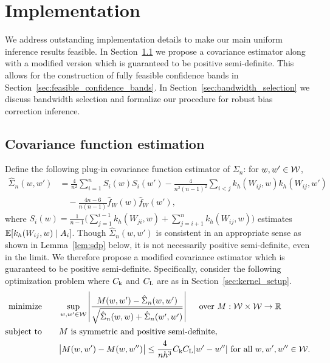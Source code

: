 \section{Implementation}\label{sec:implementation}

We address outstanding implementation details to make our main
uniform inference results feasible.
In Section~\ref{sec:covariance_estimation} we propose a covariance estimator
along with a modified version which is guaranteed to be positive semi-definite.
This allows for the construction of fully feasible confidence bands
in Section~\ref{sec:feasible_confidence_bands}.
In Section~\ref{sec:bandwidth_selection} we discuss bandwidth selection
and formalize our procedure for
robust bias correction inference.

\subsection{Covariance function estimation}
\label{sec:covariance_estimation}

Define the following plug-in covariance function
estimator of $\Sigma_n$: for $w, w' \in \mathcal{W}$,
%
\begin{align*}
  \hat \Sigma_n(w,w')
  &=
  \frac{4}{n^2}
  \sum_{i=1}^n
  S_i(w) S_i(w')
  -
  \frac{4}{n^2(n-1)^2}
  \sum_{i<j}
  k_h(W_{i j},w)
  k_h(W_{i j},w') \\
  &\quad-
  \frac{4n-6}{n(n-1)}
  \hat f_W(w)
  \hat f_W(w'),
\end{align*}
%
where
$S_i(w) = \frac{1}{n-1} \big( \sum_{j = 1}^{i-1} k_h(W_{j i}, w)
+ \sum_{j = i+1}^n k_h(W_{i j}, w) \big)$
estimates $\mathbb{E}[k_h(W_{i j},w) \mid A_i]$.
Though $\hat\Sigma_n(w,w')$ is consistent in an appropriate sense
as shown in Lemma~\ref{lem:sdp} below,
it is not necessarily positive semi-definite,
even in the limit.
We therefore propose a modified covariance estimator
which is guaranteed to be positive semi-definite.
Specifically, consider the following optimization problem
where $C_{\mathrm{k}}$ and $C_{\mathrm{L}}$ are as in Section~\ref{sec:kernel_setup}.
%
\begin{equation}
  \label{eq:sdp}
  \begin{aligned}
    \operatorname*{minimize}
    \qquad
    & \sup_{w,w' \in \mathcal{W}}
    \left|
    \frac{M(w,w') - \hat\Sigma_n(w,w')}
    {\sqrt{\hat \Sigma_n(w,w) + \hat \Sigma_n(w',w')}}
    \right|
    \quad \textup{ over } M: \mathcal{W} \times \mathcal{W} \to \mathbb{R}
    \\
    \operatorname*{subject\ to}
    \qquad
    & M \textup{ is symmetric and positive semi-definite}, \\
    & \big|M(w,w') - M(w, w'')\big|
    \leq \frac{4}{n h^3}
    C_{\mathrm{k}} C_{\mathrm{L}}
    |w'-w''|
    \textup{ for all }
    w, w', w'' \in \mathcal{W}.
  \end{aligned}
\end{equation}

